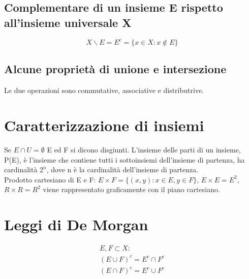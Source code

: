 \subsection{Complementare di un insieme E rispetto all'insieme universale X}
\begin{equation}
X\backslash E=E^{c}=\{x\in X: x\not\in E\}
\end{equation}
\subsection{Alcune propriet\`a di unione e intersezione}
Le due operazioni sono commutative, associative e distributrive.
\section{Caratterizzazione di insiemi}
Se $E \cap U = \emptyset$ E ed F si dicono disgiunti.
L'insieme delle parti di un insieme, P(E), \`e l'insieme che contiene tutti i sottoinsiemi dell'insieme di partenza, ha cardinalit\`a $2^{n}$, dove n \`e la cardinalit\`a
dell'insieme di partenza.\\
Prodotto cartesiano di E e F: $E\times F=\{(x,y):x\in E, y\in F\}$, $E\times E=E^2$, $R\times R=R^2$ viene rappresentato graficamente con il piano cartesiano.
\section{Leggi di De Morgan}
\begin{gather*}
E,F \subset X:\\
(E \cup F)^{c}=E^{c}\cap F^{c}\\
(E \cap F)^{c}=E^{c}\cup F^{c}
\end{gather*}
